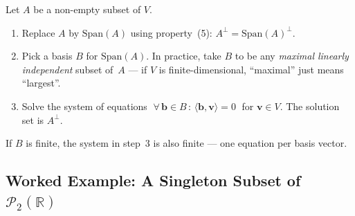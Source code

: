 \documentclass[11pt, a4paper, notitlepage]{report}
\theoremstyle{definition}
\theoremstyle{remark}
\begin{document}
\begin{examtip}[title={Procedure: Finding $A^\perp$ for a Non-Empty Set $A$}]
Let $A$ be a non-empty subset of $V$.
\begin{enumerate}
  \item Replace $A$ by $\mathrm{Span}(A)$ using property~(5):
        $A^\perp = \mathrm{Span}(A)^\perp$.
  \item Pick a basis $B$ for $\mathrm{Span}(A)$. In practice, take $B$ to be any
        \emph{maximal linearly independent} subset of~$A$ --- if $V$ is
        finite-dimensional, ``maximal'' just means ``largest''.
  \item Solve the system of equations
        $\;\forall\,\mathbf{b}\in B\,:\,\langle\mathbf{b},\mathbf{v}\rangle = 0\;$
        for $\mathbf{v}\in V$. The solution set is $A^\perp$.
\end{enumerate}
If $B$ is finite, the system in step~3 is also finite --- one equation per basis vector.
\end{examtip}

\subsection{Worked Example: A Singleton Subset of $\mathscr{P}_2(\mathbb{R})$}
\label{subsec:orth-comp-poly}
\end{document}
